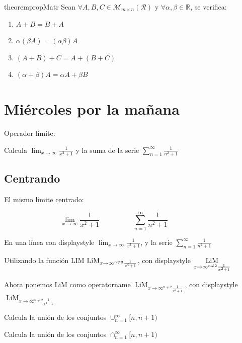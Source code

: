 \begin{restatable}{theorem}{propMatr} \label{thm:propMatr}
	Sean $\forall A, B, C\in \mathcal{M}_{m\times n}(\mathcal{R})$ y $\forall \alpha, \beta\in \mathbb{R}$, se verifica:
	\begin{multicols}{2}
		\begin{enumerate} 
			\item $A+B=B+A$
			\item $\alpha(\beta A)=(\alpha \beta)A$
			\item $(A+B)+C=A+(B+C)$
			\item $(\alpha+\beta)A=\alpha A + \beta B$
		\end{enumerate}
	\end{multicols}
\end{restatable}

\section[Miercoles mañana]{Miércoles por la mañana}

Operador límite:

Calcula $\lim_{x\to \infty}\frac{1}{x^2+1}$ y la suma de la serie $\sum_{n=1}^{\infty}\frac{1}{n^2+1}$

\subsection{Centrando}

El mismo límite centrado:

\[
\lim_{x\to \infty}\frac{1}{x^2+1} \hspace{2cm} \sum_{n=1}^{\infty}\frac{1}{n^2+1}\hspace{2cm}
\]

En una línea con displaystyle $\displaystyle\lim_{x\to \infty}\frac{1}{x^2+1}$, y la serie $\displaystyle \sum_{n=1}^{\infty}\frac{1}{n^2+1}$

Utilizando la función LIM $\operatorname*{LiM}_{x\to \infty^{n\neq\dot{2}}\frac{1}{x^2+1}}$, con displaystyle $\displaystyle\operatorname*{LiM}_{x\to \infty^{n\neq\dot{2}}\frac{1}{x^2+1}}$

Ahora ponemos LiM como operatorname $\operatorname{LiM}_{x\to \infty^{n\neq\dot{2}}\frac{1}{x^2+1}}$, con displaystyle $\displaystyle\operatorname{LiM}_{x\to \infty^{n\neq\dot{2}}\frac{1}{x^2+1}}$

Calcula la unión de los conjuntos $\cup_{n=1}^{\infty} [n,n+1)$

Calcula la unión de los conjuntos $\cap_{n=1}^{\infty} [n,n+1)$

